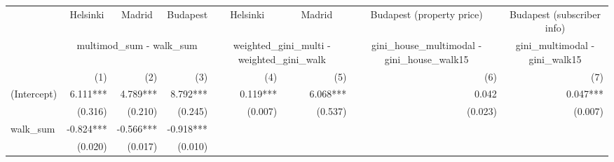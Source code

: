 \begin{tabular}{lrrrrrrr}
\toprule
                                           & \multicolumn{1}{c}{Helsinki} & \multicolumn{1}{c}{Madrid} & \multicolumn{1}{c}{Budapest} &   \multicolumn{1}{c}{Helsinki}   &   \multicolumn{1}{c}{Madrid}   &           \multicolumn{1}{c}{Budapest (property price)}           &    \multicolumn{1}{c}{Budapest (subscriber info)}   \\ 
\cmidrule(lr){2-2} \cmidrule(lr){3-3} \cmidrule(lr){4-4} \cmidrule(lr){5-5} \cmidrule(lr){6-6} \cmidrule(lr){7-7} \cmidrule(lr){8-8} 
                                           &                       \multicolumn{3}{c}{multimod\_sum - walk\_sum}                      &  \multicolumn{2}{c}{weighted\_gini\_multi - weighted\_gini\_walk} & \multicolumn{1}{c}{gini\_house\_multimodal - gini\_house\_walk15} & \multicolumn{1}{c}{gini\_multimodal - gini\_walk15} \\ 
\cmidrule(lr){2-4} \cmidrule(lr){5-6} \cmidrule(lr){7-7} \cmidrule(lr){8-8} 
                                           &                          (1) &                        (2) &                          (3) &                              (4) &                            (5) &                                                               (6) &                                                 (7) \\ 
\midrule
(Intercept)                                &                     6.111*** &                   4.789*** &                     8.792*** &                         0.119*** &                       6.068*** &                                                             0.042 &                                            0.047*** \\ 
                                           &                      (0.316) &                    (0.210) &                      (0.245) &                          (0.007) &                        (0.537) &                                                           (0.023) &                                             (0.007) \\ 
walk\_sum                                  &                    -0.824*** &                  -0.566*** &                    -0.918*** &                                  &                                &                                                                   &                                                     \\ 
                                           &                      (0.020) &                    (0.017) &                      (0.010) &                                  &                                &                                                                   &                                                     \\ 

\end{tabular}
